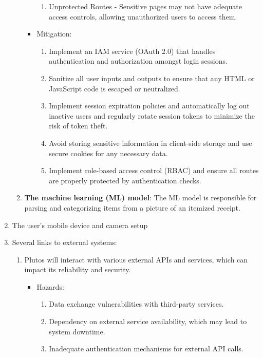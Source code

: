 \documentclass{article}
\begin{document}
\begin{enumerate}
\begin{enumerate}
\begin{itemize}
\begin{enumerate}
					\item Unprotected Routes - Sensitive pages may not have adequate access controls, allowing unauthorized users to access them.
				\end{enumerate}
			\item Mitigation:
				\begin{enumerate}
					\item Implement an IAM service (OAuth 2.0) that handles authentication and authorization amongst login sessions.
					\item Sanitize all user inputs and outputs to ensure that any HTML or JavaScript code is escaped or neutralized.
					\item Implement session expiration policies and automatically log out inactive users and regularly rotate session tokens to minimize the risk of token theft.
					\item Avoid storing sensitive information in client-side storage and use secure cookies for any necessary data.
					\item Implement role-based access control (RBAC) and ensure all routes are properly protected by authentication checks.
				\end{enumerate}
		\end{itemize}
        \item \textbf{The machine learning (ML) model}: The ML model is
        responsible for parsing and categorizing items from a picture of an
        itemized receipt.
    \end{enumerate}
    \item The user’s mobile device and camera setup
    \item Several links to external systems:
    \begin{enumerate}
        \item Plutos will interact with various external APIs and services, which can 
        impact its reliability and security. 
		\begin{itemize}
			\item Hazards:
				\begin{enumerate}
					\item Data exchange vulnerabilities with third-party services.
                    \item Dependency on external service availability, which may lead to system downtime.
                    \item Inadequate authentication mechanisms for external API calls.
				\end{enumerate}

\end{itemize}
\end{enumerate}
\end{enumerate}
\end{document}
